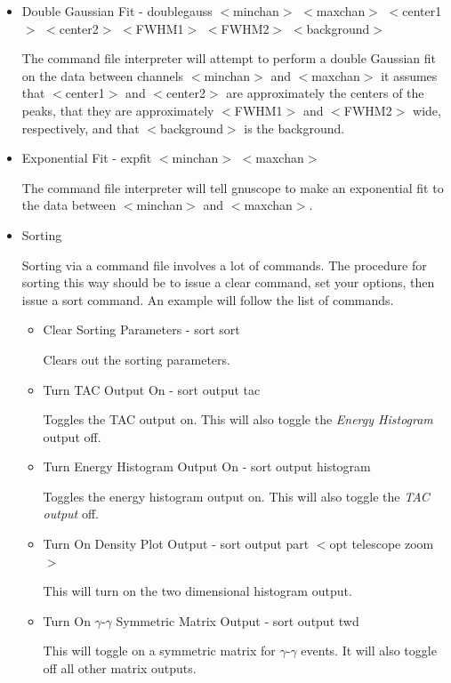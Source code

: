 \begin{itemize}
\item{Double Gaussian Fit - doublegauss $<$minchan$>$ $<$maxchan$>$ $<$center1$>$ $<$center2$>$ $<$FWHM1$>$ $<$FWHM2$>$ $<$background$>$}

The command file interpreter will attempt to perform a double Gaussian fit on the data between channels $<$minchan$>$ and $<$maxchan$>$ it assumes that $<$center1$>$ and $<$center2$>$ are approximately the centers of the peaks, that they are approximately $<$FWHM1$>$ and $<$FWHM2$>$ wide, respectively, and that $<$background$>$ is the background.

\item{Exponential Fit - expfit $<$minchan$>$ $<$maxchan$>$}

The command file interpreter will tell gnuscope to make an exponential fit to the data between $<$minchan$>$ and $<$maxchan$>$.

\item{Sorting}

Sorting via a command file involves a lot of commands.  The procedure for sorting this way should be to issue a clear command, set your options, then issue a sort command.  An example will follow the list of commands.

\begin{itemize}

\item{Clear Sorting Parameters - sort sort}

Clears out the sorting parameters.

\item{Turn TAC Output On - sort output tac}

Toggles the TAC output on.  This will also toggle the {\it Energy Histogram} output off.

\item{Turn Energy Histogram Output On - sort output histogram}

Toggles the energy histogram output on.  This will also toggle the {\it TAC output} off.

\item{Turn On Density Plot Output - sort output part $<$opt telescope zoom$>$}

This will turn on the two dimensional histogram output.

\item{Turn On $\gamma$-$\gamma$ Symmetric Matrix Output - sort output twd}

This will toggle on a symmetric matrix for $\gamma$-$\gamma$ events.  It will also toggle off all other matrix outputs.


\end{itemize}
\end{itemize}
